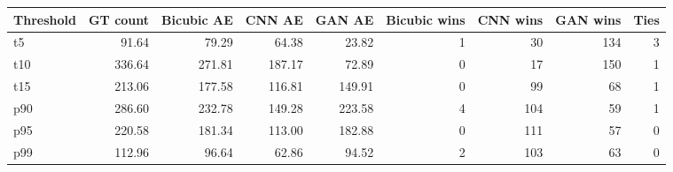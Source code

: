 \begin{tabular}{lrrrrrrrr}
\toprule
Threshold & GT count & Bicubic AE & CNN AE & GAN AE & Bicubic wins & CNN wins & GAN wins & Ties \\
\midrule
t5 & 91.64 & 79.29 & 64.38 & 23.82 & 1 & 30 & 134 & 3 \\
t10 & 336.64 & 271.81 & 187.17 & 72.89 & 0 & 17 & 150 & 1 \\
t15 & 213.06 & 177.58 & 116.81 & 149.91 & 0 & 99 & 68 & 1 \\
p90 & 286.60 & 232.78 & 149.28 & 223.58 & 4 & 104 & 59 & 1 \\
p95 & 220.58 & 181.34 & 113.00 & 182.88 & 0 & 111 & 57 & 0 \\
p99 & 112.96 & 96.64 & 62.86 & 94.52 & 2 & 103 & 63 & 0 \\
\bottomrule
\end{tabular}
